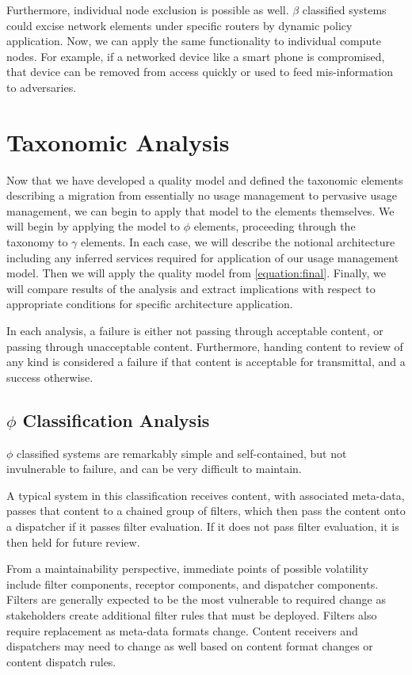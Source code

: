 Furthermore, individual node exclusion is possible as well. $\beta$ classified systems could excise network elements under specific routers by dynamic policy application.  Now, we can apply the same functionality to individual compute nodes.  For example, if a networked device like a smart phone is compromised, that device can be removed from access quickly or used to feed mis-information to adversaries.

\section{Taxonomic Analysis}
Now that we have developed a quality model and defined the taxonomic elements describing a migration from essentially no usage management to pervasive usage management, we can begin to apply that model to the elements themselves.  We will begin by applying the model to $\phi$ elements, proceeding through the taxonomy to $\gamma$ elements.  In each case, we will describe the notional architecture including any inferred services required for application of our usage management model.  Then we will apply the quality model from \ref{equation:final}.  Finally, we will compare results of the analysis and extract implications with respect to appropriate conditions for specific architecture application.

In each analysis, a failure is either not passing through acceptable content, or passing through unacceptable content. Furthermore, handing content to review of any kind is considered a failure if that content is acceptable for transmittal, and a success otherwise.

\subsection{$\phi$ Classification Analysis}
$\phi$ classified systems are remarkably simple and self-contained, but not invulnerable to failure, and can be very difficult to maintain.

A typical system in this classification receives content, with associated meta-data, passes that content to a chained group of filters, which then pass the content onto a dispatcher if it passes filter evaluation.  If it does not pass filter evaluation, it is then held for future review.


From a maintainability perspective, immediate points of possible volatility include filter components, receptor components, and dispatcher components.  Filters are generally expected to be the most vulnerable to required change as stakeholders create additional filter rules that must be deployed.  Filters also require replacement as meta-data formats change.  Content receivers and dispatchers may need to change as well based on content format changes or content dispatch rules.

